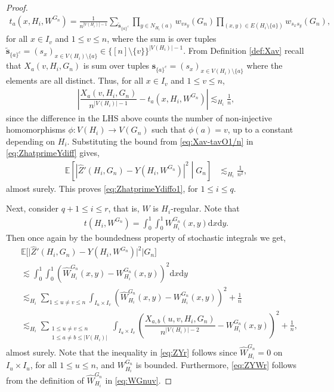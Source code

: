 \documentclass[11pt,reqno]{amsart}
\numberwithin{equation}{section}
\newcommand{\E}{\mathbb{E}}
\newcommand{\ra}{\rightarrow}
\theoremstyle{definition}
\begin{document}
\begin{proof}
    \begin{align*}
        t_a(x, H_i, W^{G_n}) = \frac{1}{n^{|V(H_i)|-1}}\sum_{\tilde{\bm s}_{\{a\}^c}}\prod_{y \in N_{H_i}(a)}w_{vs_y}(G_n)\prod_{(x, y)\in E(H_i\setminus \{a\})}w_{ s_x s_y }(G_n) ,
    \end{align*} 
    for all $x\in I_v$ and $1\leq v\leq n$,  where the sum is over tuples $\tilde{\bm s}_{\{a\}^c} = (s_x)_{x\in V(H_i)\setminus\{a\}}\in \{[n]\setminus\{v\}\}^{|V(H_i)|-1}$. From Definition \ref{def:Xav} recall that $X_{a}(v,H_i, G_n)$ is sum over tuples $\bm s_{\{a\}^c} = (s_x)_{x\in V(H_i)\setminus\{a\}}$ where the elements are all distinct. Thus, for all $x\in I_v$ and $1\leq v\leq n$, 
    \begin{align}\label{eq:Xav-tavO1/n}
        \left|\dfrac{X_a(v, H_i, G_n)}{n^{|V(H_i)|-1}} - t_{a}\left(x,H_{i},W^{G_{n}}\right)\right| \lesssim_{H_i}\frac{1}{n} ,
    \end{align}
    since the difference in the LHS above counts the number of non-injective homomorphisms $\phi:V(H_i)\ra V(G_n)$ such that $\phi(a) = v$, up to a constant depending on $H_i$. Substituting the bound from \eqref{eq:Xav-tavO1/n} in \eqref{eq:ZhatprimeYdiff} gives,
    \begin{align*}
        \E\left[\left|\hat Z'(H_i,G_n) - Y(H_i,W^{G_n})\right|^2\middle|G_n\right] 
        &\lesssim_{H_i}\frac{1}{n^2} , 
    \end{align*}
    almost surely. This proves \eqref{eq:ZhatprimeYdiffo1}, for $1\leq i\leq q$.

    Next, consider $q+1\leq i\leq r$, that is, $W$ is $H_i$-regular. Note that 
    \begin{align*}
        t(H_i, W^{G_n}) = \int_0^1\int_0^1 W_{H_i}^{G_n}(x,y)\mathrm dx\mathrm dy.
    \end{align*}
    Then once again by the boundedness property of stochastic integrals we get,
    \begin{align}
        & \E\bigg[\bigg|\hat Z'(H_i,G_n) - Y(H_i,W^{G_n})\bigg|^2 \bigg| G_n \bigg] \nonumber \\ 
        &\lesssim \int_0^1\int_0^1\left(\hat W_{H_i}^{G_n}(x,y) - W_{H_i}^{G_n}(x,y)\right)^2\mathrm dx\mathrm dy \nonumber \\
        &\lesssim_{H_i}\sum_{1\leq u\neq v\leq n}\int_{I_u\times I_v}\left(\hat W_{H_i}^{G_n}(x,y) - W_{H_i}^{G_n}(x,y)\right)^2 + \frac{1}{n} \label{eq:ZYr} \\ 
        &\lesssim_{H_i} \sum_{\substack{1\leq u\neq v\leq n\\1\leq a\neq b\leq |V(H_i)|}}\int_{I_u\times I_v}\left(\dfrac{X_{a,b}(u,v,H_i,G_n)}{n^{|V(H_i)|-2}} - W_{H_i}^{G_n}(x,y)\right)^2 + \frac{1}{n} , \label{eq:ZYWr} 
    \end{align}
    almost surely. Note that the inequality in \eqref{eq:ZYr} follows since $\hat W_{H_i}^{G_n} = 0$ on $I_u\times I_u$, for all $1\leq u\leq n$, and $W_{H_i}^{G_n}$ is bounded. Furthermore, \eqref{eq:ZYWr} follows from the definition of $\hat W_{H_i}^{G_n}$ in \eqref{eq:WGnuv}. 


\end{proof}
\end{document}
